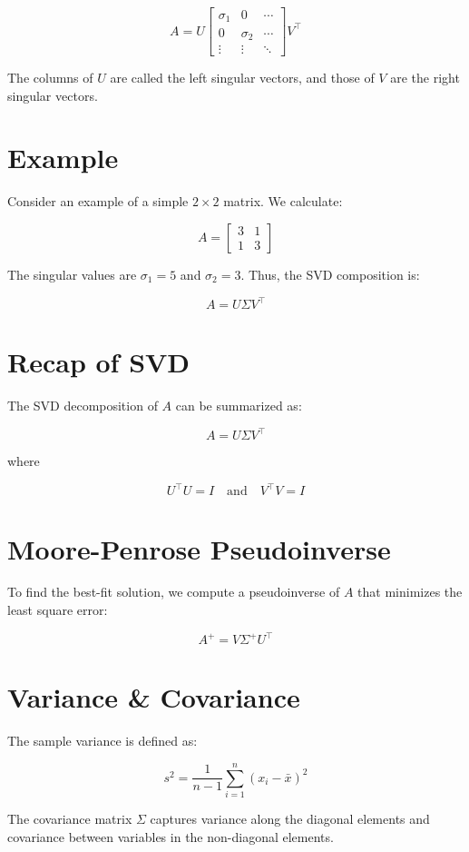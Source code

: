 \documentclass{ximera}
\begin{document}
\[
A = U \begin{bmatrix} \sigma_1 & 0 & \cdots \\ 0 & \sigma_2 & \cdots \\ \vdots & \vdots & \ddots \end{bmatrix} V^\top
\]

The columns of \(U\) are called the left singular vectors, and those of \(V\) are the right singular vectors.

\section{Example}
Consider an example of a simple \(2 \times 2\) matrix. We calculate:

\[
A = \begin{bmatrix} 3 & 1 \\ 1 & 3 \end{bmatrix}
\]

The singular values are \(\sigma_1 = 5\) and \(\sigma_2 = 3\). Thus, the SVD composition is:

\[
A = U \Sigma V^\top
\]

\section{Recap of SVD}
The SVD decomposition of \(A\) can be summarized as:

\[
A = U \Sigma V^\top
\]

where

\[
U^\top U = I \quad \text{and} \quad V^\top V = I
\]

\section{Moore-Penrose Pseudoinverse}
To find the best-fit solution, we compute a pseudoinverse of \(A\) that minimizes the least square error:

\[
A^+ = V \Sigma^+ U^\top
\]

\section{Variance \& Covariance}
The sample variance is defined as:

\[
s^2 = \frac{1}{n-1} \sum_{i=1}^n (x_i - \bar{x})^2
\]

The covariance matrix \(\Sigma\) captures variance along the diagonal elements and covariance between variables in the non-diagonal elements.
\end{document}
